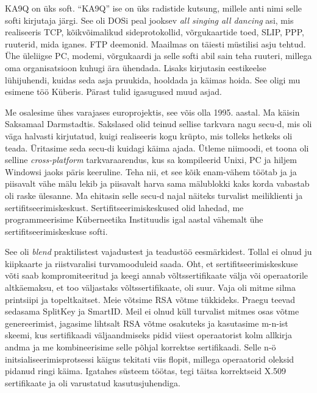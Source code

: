
KA9Q on üks soft. \enquote{KA9Q} ise on üks radistide kutsung, millele anti nimi
selle softi kirjutaja järgi. See oli DOSi peal 
jooksev \emph{all singing all dancing} asi, mis realiseeris TCP, kõikvõimalikud 
sideprotokollid, võrgukaartide toed, SLIP, PPP, ruuterid, mida iganes. FTP 
deemonid. Maailmas on täiesti müstilisi asju tehtud. Ühe  
üleliigse PC, modemi, võrgukaardi ja selle softi abil sain teha ruuteri, 
millega oma organisatsioon kuhugi ära ühendada. Lisaks kirjutasin eestikeelse lühijuhendi, kuidas seda asja pruukida, hooldada ja 
käimas hoida. See oligi mu esimene töö Küberis. Pärast tulid igasugused muud asjad.

Me osalesime ühes varajases europrojektis, see võis olla 1995. 
aastal. Ma käisin Saksamaal Darmstadtis. Sakslased olid 
teinud sellise tarkvara nagu secu-d, mis oli väga halvasti kirjutatud, kuigi
realiseeris kogu krüpto, mis tolleks hetkeks oli teada. Üritasime seda secu-di kuidagi käima ajada. Ütleme niimoodi, et toona oli selline \emph{cross-platform} tarkvaraarendus, kus sa kompileerid Unixi, PC ja hiljem Windowsi jaoks päris keeruline. Teha nii, et see kõik enam-vähem töötab ja ja piisavalt vähe mälu lekib ja piisavalt harva sama mälublokki kaks korda vabastab oli raske ülesanne. Ma ehitasin selle secu-d najal näiteks turvalist meiliklienti ja sertifitseerimiskeskust. 
Sertifitseerimiskeskused olid lahedad, me programmeerisime Küberneetika Instituudis igal aastal vähemalt ühe 
sertifitseerimiskeskuse softi.


See oli \emph{blend} praktilistest vajadustest ja 
teadustöö eesmärkidest. Tollal ei olnud ju kiipkaarte ja 
riistvaralisi turvamooduleid saada. Oht, et 
sertifitseerimiskeskuse võti saab kompromiteeritud ja keegi annab võltssertifikaate välja või 
operaatorile altkäemaksu, et too väljastaks võltssertifikaate, oli suur. Vaja oli mitme silma printsiipi ja topeltkaitset. Meie võtsime RSA võtme tükkideks. Praegu teevad sedasama SplitKey ja SmartID. 
Meil ei olnud küll turvalist mitmes osas võtme genereerimist, jagasime lihtsalt
RSA võtme osakuteks ja kasutasime m-n-ist skeemi, kus  
sertifikaadi väljaandmiseks pidid viiest operaatorist kolm 
allkirja andma ja me kombineerisime selle põhjal korrektse sertifikaadi. Selle 
n-ö initsialiseerimisprotsessi käigus tekitati viis flopit, millega operaatorid oleksid pidanud ringi käima. Igatahes süsteem 
töötas, tegi täitsa korrektseid X.509 sertifikaate ja oli varustatud kasutusjuhendiga.  
 
